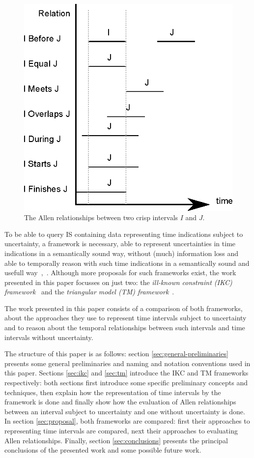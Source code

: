 \begin{figure}[h]
   \centering
   \includegraphics[width=0.9\columnwidth]{graphs/allen.eps}
   \caption{The Allen relationships between two crisp intervals $I$ and $J$.  }
   \label{fig:allen-relationships}
 \end{figure}

To be able to query IS containing data representing time indications subject to uncertainty, a framework is necessary, able to represent uncertainties in time indications in a semantically sound way, without (much) information loss and able to temporally reason with such time indications in a semantically sound and usefull way~\cite{Dubois1983},~\cite{Dubois2003}. Although more proposals for such frameworks exist, the work presented in this paper focusses on just two: the \emph{ill-known constraint \emph{(IKC)} framework}~\cite{Pons2011} and the \emph{triangular model \emph{(TM)} framework}~\cite{DeTre2012}.

The work presented in this paper consists of a comparison of both frameworks, about the approaches they use to represent time intervals subject to uncertainty and to reason about the temporal relationships between such intervals and time intervals without uncertainty.

The structure of this paper is as follows: section \ref{sec:general-preliminaries} presents some general preliminaries and naming and notation conventions used in this paper. Sections \ref{sec:ikc} and \ref{sec:tm} introduce the IKC and TM frameworks respectively: both sections first introduce some specific preliminary concepts and techniques, then explain how the representation of time intervals by the framework is done and finally show how the evaluation of Allen relationships between an interval subject to uncertainty and one without uncertainty is done. In section \ref{sec:proposal}, both frameworks are compared: first their approaches to representing time intervals are compared, next their approaches to evaluating Allen relationships. Finally, section \ref{sec:conclusions} presents the principal conclusions of the presented work and some possible future work. 

